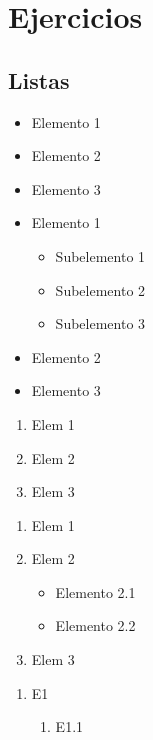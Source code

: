 \documentclass{article}
\begin{document}
\section{Ejercicios}
\subsection{Listas}

\begin{itemize}
\item Elemento 1
\item Elemento 2
  \item Elemento 3
  \end{itemize}

\begin{itemize}
\item Elemento 1
  \begin{itemize}
  \item Subelemento 1
  \item Subelemento 2
      \item Subelemento 3
  \end{itemize}
\item Elemento 2
  \item Elemento 3
  \end{itemize}
  
  \begin{enumerate}
  \item Elem 1
  \item Elem 2
    \item Elem 3
    \end{enumerate}

      \begin{enumerate}[label=\alph*)]
  \item Elem 1
  \item Elem 2
    \begin{itemize}
    \item Elemento 2.1
    \item Elemento 2.2
    \end{itemize}
    \item Elem 3
    \end{enumerate}

    \begin{enumerate}
    \item E1
      \begin{enumerate}
      \item E1.1
      \end{enumerate}
     \end{enumerate}
\end{document}
